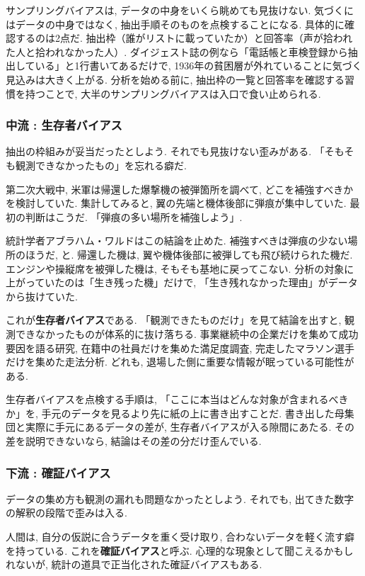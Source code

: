 サンプリングバイアスは, データの中身をいくら眺めても見抜けない.
気づくにはデータの中身ではなく, 抽出手順そのものを点検することになる.
具体的に確認するのは2点だ. 抽出枠（誰がリストに載っていたか）と回答率（声が拾われた人と拾われなかった人）.
ダイジェスト誌の例なら「電話帳と車検登録から抽出している」と1行書いてあるだけで, 1936年の貧困層が外れていることに気づく見込みは大きく上がる.
分析を始める前に, 抽出枠の一覧と回答率を確認する習慣を持つことで, 大半のサンプリングバイアスは入口で食い止められる.

\subsubsection*{中流 : 生存者バイアス}

抽出の枠組みが妥当だったとしよう. それでも見抜けない歪みがある.
「そもそも観測できなかったもの」を忘れる癖だ.

第二次大戦中, 米軍は帰還した爆撃機の被弾箇所を調べて, どこを補強すべきかを検討していた.
集計してみると, 翼の先端と機体後部に弾痕が集中していた.
最初の判断はこうだ. 「弾痕の多い場所を補強しよう」.

統計学者アブラハム・ワルドはこの結論を止めた.
補強すべきは弾痕の少ない場所のほうだ, と.
帰還した機は, 翼や機体後部に被弾しても飛び続けられた機だ.
エンジンや操縦席を被弾した機は, そもそも基地に戻ってこない.
分析の対象に上がっていたのは「生き残った機」だけで, 「生き残れなかった理由」がデータから抜けていた.

これが\textbf{生存者バイアス}である.
「観測できたものだけ」を見て結論を出すと, 観測できなかったものが体系的に抜け落ちる.
事業継続中の企業だけを集めて成功要因を語る研究, 在籍中の社員だけを集めた満足度調査, 完走したマラソン選手だけを集めた走法分析.
どれも, 退場した側に重要な情報が眠っている可能性がある.

生存者バイアスを点検する手順は, 「ここに本当はどんな対象が含まれるべきか」を, 手元のデータを見るより先に紙の上に書き出すことだ.
書き出した母集団と実際に手元にあるデータの差が, 生存者バイアスが入る隙間にあたる.
その差を説明できないなら, 結論はその差の分だけ歪んでいる.

\subsubsection*{下流 : 確証バイアス}

データの集め方も観測の漏れも問題なかったとしよう.
それでも, 出てきた数字の解釈の段階で歪みは入る.

人間は, 自分の仮説に合うデータを重く受け取り, 合わないデータを軽く流す癖を持っている.
これを\textbf{確証バイアス}と呼ぶ.
心理的な現象として聞こえるかもしれないが, 統計の道具で正当化された確証バイアスもある.

